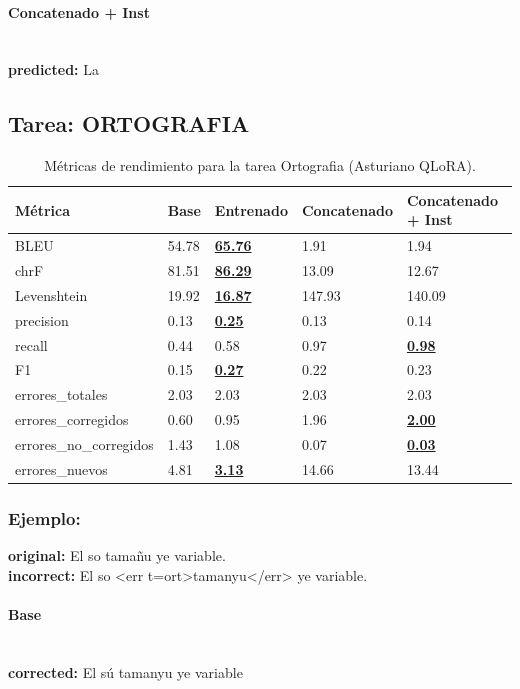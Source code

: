 \paragraph{Concatenado + Inst}~\\
\textbf{predicted:} La

\subsection{Tarea: ORTOGRAFIA}\label{tarea-ortografia}
\begin{longtable}[]{@{}lllll@{}}
\toprule\noalign{}
Métrica & Base & Entrenado & Concatenado & Concatenado + Inst \\
\midrule\noalign{}
\endhead
\bottomrule\noalign{}
\caption{Métricas de rendimiento para la tarea Ortografia (Asturiano QLoRA).}
\label{tab:metricas_ortografia_Asturiano QLoRA}
\endlastfoot
BLEU & 54.78 & \textbf{\underline{65.76}} & 1.91 & 1.94 \\
chrF & 81.51 & \textbf{\underline{86.29}} & 13.09 & 12.67 \\
Levenshtein & 19.92 & \textbf{\underline{16.87}} & 147.93 & 140.09 \\
precision & 0.13 & \textbf{\underline{0.25}} & 0.13 & 0.14 \\
recall & 0.44 & 0.58 & 0.97 & \textbf{\underline{0.98}} \\
F1 & 0.15 & \textbf{\underline{0.27}} & 0.22 & 0.23 \\
errores\_totales & 2.03 & 2.03 & 2.03 & 2.03 \\
errores\_corregidos & 0.60 & 0.95 & 1.96 & \textbf{\underline{2.00}} \\
errores\_no\_corregidos & 1.43 & 1.08 & 0.07 & \textbf{\underline{0.03}} \\
errores\_nuevos & 4.81 & \textbf{\underline{3.13}} & 14.66 & 13.44 \\
\end{longtable}

\subsubsection{Ejemplo:}
\textbf{original:} El so tamañu ye variable.\\
\textbf{incorrect:} El so {\textless}err t=ort{\textgreater}tamanyu{\textless}/err{\textgreater} ye variable.

\paragraph{Base}~\\
\textbf{corrected:} El sú tamanyu ye variable

